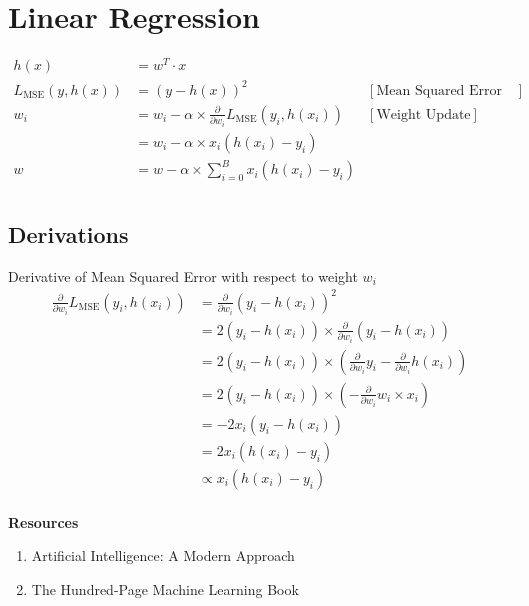 \section{Linear Regression}

\begin{align*}
    h(x) &= w^T \cdot x &\\ 
    L_{\text{MSE}}(y, h(x)) &= (y-h(x))^2 & [\text{Mean Squared Error Loss}]\\
    w_i &= w_i - \alpha \times \frac{\partial}{\partial w_i} L_{\text{MSE}}(y_i, h(x_i)) & [\text{Weight Update}]\\
    &= w_i - \alpha \times x_i(h(x_i) - y_i)\\
    w &= w -\alpha \times \sum^{B}_{i=0} x_i(h(x_i) - y_i)\\
\end{align*}



\subsection{Derivations}
Derivative of Mean Squared Error with respect to weight $w_i$\\

\begin{align*}
    \frac{\partial}{\partial w_i} L_{\text{MSE}}(y_i, h(x_i)) &= \frac{\partial}{\partial w_i} (y_i - h(x_i))^2\\
    &= 2(y_i - h(x_i)) \times \frac{\partial}{\partial w_i} (y_i - h(x_i))\\
    &= 2(y_i - h(x_i)) \times \left(\frac{\partial}{\partial w_i} y_i - \frac{\partial}{\partial w_i}h(x_i)\right)\\
    &= 2(y_i - h(x_i)) \times \left(-\frac{\partial}{\partial w_i}w_i \times x_i\right)\\
    &= -2x_i(y_i - h(x_i))\\
    &= 2x_i(h(x_i)-y_i)\\
    &\propto x_i(h(x_i)-y_i)\\
\end{align*}

\textbf{Resources}
\begin{enumerate}
    \item Artificial Intelligence: A Modern Approach~\cite{russell1}
    \item The Hundred-Page Machine Learning Book~\cite{burkov1}
\end{enumerate}
